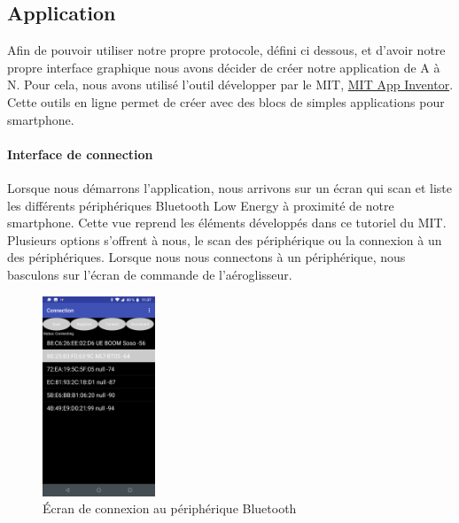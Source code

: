 			\subsection{Application}
			Afin de pouvoir utiliser notre propre protocole, défini ci dessous, et d'avoir notre propre interface graphique nous avons décider de créer notre application de A à N. Pour cela, nous avons utilisé l'outil développer par le MIT, \href{http://ai2.appinventor.mit.edu/}{MIT App Inventor}. Cette outils en ligne permet de créer avec des blocs de simples applications pour smartphone.
		\paragraph{Interface de connection} Lorsque nous démarrons l'application, nous arrivons sur un écran qui scan et liste les différents périphériques Bluetooth Low Energy à proximité de notre smartphone. Cette vue reprend les éléments développés dans ce tutoriel \cite{tutoBLE} du MIT. Plusieurs options s'offrent à nous, le scan des périphérique ou la connexion à un des périphériques. Lorsque nous nous connectons à un périphérique, nous basculons sur l'écran de commande de l'aéroglisseur.
		\begin{figure}
			\begin{center}
				\includegraphics[width=0.3\textwidth]{../Illus/AppConnection.png}
			\end{center}
			\caption{Écran de connexion au périphérique Bluetooth}
		\end{figure}
